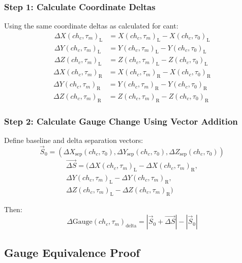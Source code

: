 \documentclass{article}
\newcommand{\chainage}[1]{ch_{#1}}
\newcommand{\Left}{\text{L}}
\newcommand{\Right}{\text{R}}
\newcommand{\X}[3]{X(#1, #2)_{#3}}
\newcommand{\Y}[3]{Y(#1, #2)_{#3}}
\newcommand{\Z}[3]{Z(#1, #2)_{#3}}
\newcommand{\DX}[3]{\Delta X(#1, #2)_{#3}}
\newcommand{\DY}[3]{\Delta Y(#1, #2)_{#3}}
\newcommand{\DZ}[3]{\Delta Z(#1, #2)_{#3}}
\newcommand{\DGauge}[2]{\Delta\text{Gauge}(#1, #2)}
\newcommand{\SepX}[2]{\Delta X_{\text{sep}}(#1, #2)}
\newcommand{\SepY}[2]{\Delta Y_{\text{sep}}(#1, #2)}
\newcommand{\SepZ}[2]{\Delta Z_{\text{sep}}(#1, #2)}
\begin{document}
\subsubsection{Step 1: Calculate Coordinate Deltas}
Using the same coordinate deltas as calculated for cant:
\begin{align}
\DX{\chainage{c}}{\tau_m}{\Left} &= \X{\chainage{c}}{\tau_m}{\Left} - \X{\chainage{c}}{\tau_0}{\Left} \\
\DY{\chainage{c}}{\tau_m}{\Left} &= \Y{\chainage{c}}{\tau_m}{\Left} - \Y{\chainage{c}}{\tau_0}{\Left} \\
\DZ{\chainage{c}}{\tau_m}{\Left} &= \Z{\chainage{c}}{\tau_m}{\Left} - \Z{\chainage{c}}{\tau_0}{\Left}
\end{align}
\begin{align}
\DX{\chainage{c}}{\tau_m}{\Right} &= \X{\chainage{c}}{\tau_m}{\Right} - \X{\chainage{c}}{\tau_0}{\Right} \\
\DY{\chainage{c}}{\tau_m}{\Right} &= \Y{\chainage{c}}{\tau_m}{\Right} - \Y{\chainage{c}}{\tau_0}{\Right} \\
\DZ{\chainage{c}}{\tau_m}{\Right} &= \Z{\chainage{c}}{\tau_m}{\Right} - \Z{\chainage{c}}{\tau_0}{\Right}
\end{align}

\subsubsection{Step 2: Calculate Gauge Change Using Vector Addition}
Define baseline and delta separation vectors:
\begin{equation}
\vec{S}_0 = (\SepX{\chainage{c}}{\tau_0}, \SepY{\chainage{c}}{\tau_0}, \SepZ{\chainage{c}}{\tau_0})
\end{equation}
\begin{multline}
\vec{\Delta S} = (\DX{\chainage{c}}{\tau_m}{\Left} - \DX{\chainage{c}}{\tau_m}{\Right}, \\
\DY{\chainage{c}}{\tau_m}{\Left} - \DY{\chainage{c}}{\tau_m}{\Right}, \\
\DZ{\chainage{c}}{\tau_m}{\Left} - \DZ{\chainage{c}}{\tau_m}{\Right})
\end{multline}

Then:
\begin{equation}
\DGauge{\chainage{c}}{\tau_m}_{\text{delta}} = |\vec{S}_0 + \vec{\Delta S}| - |\vec{S}_0|
\end{equation}

\subsection{Gauge Equivalence Proof}
\end{document}

